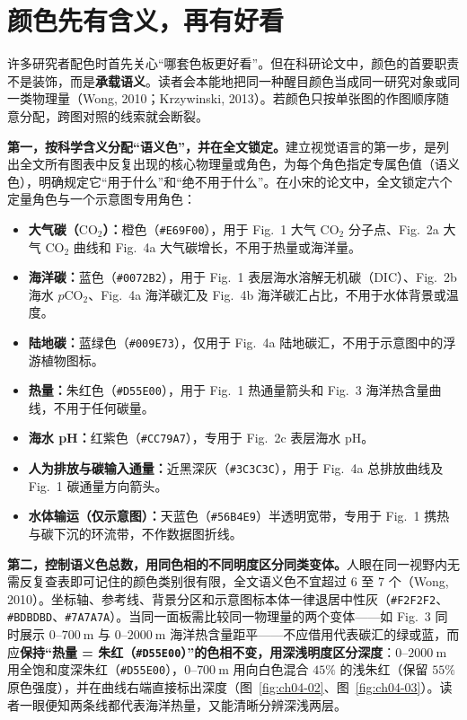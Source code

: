 \section{颜色先有含义，再有好看}

许多研究者配色时首先关心“哪套色板更好看”。但在科研论文中，颜色的首要职责不是装饰，而是\textbf{承载语义}。读者会本能地把同一种醒目颜色当成同一研究对象或同一类物理量（Wong, 2010；Krzywinski, 2013）。若颜色只按单张图的作图顺序随意分配，跨图对照的线索就会断裂。

\textbf{第一，按科学含义分配“语义色”，并在全文锁定。}建立视觉语言的第一步，是列出全文所有图表中反复出现的核心物理量或角色，为每个角色指定专属色值（语义色），明确规定它“用于什么”和“绝不用于什么”。在小宋的论文中，全文锁定六个定量角色与一个示意图专用角色：
\begin{itemize}
\item \textbf{大气碳（$\text{CO}_2$）：}橙色（\texttt{\#E69F00}），用于 Fig.\ 1 大气 $\text{CO}_2$ 分子点、Fig.\ 2a 大气 $\text{CO}_2$ 曲线和 Fig.\ 4a 大气碳增长，不用于热量或海洋量。
\item \textbf{海洋碳：}蓝色（\texttt{\#0072B2}），用于 Fig.\ 1 表层海水溶解无机碳（DIC）、Fig.\ 2b 海水 $p\text{CO}_2$、Fig.\ 4a 海洋碳汇及 Fig.\ 4b 海洋碳汇占比，不用于水体背景或温度。
\item \textbf{陆地碳：}蓝绿色（\texttt{\#009E73}），仅用于 Fig.\ 4a 陆地碳汇，不用于示意图中的浮游植物图标。
\item \textbf{热量：}朱红色（\texttt{\#D55E00}），用于 Fig.\ 1 热通量箭头和 Fig.\ 3 海洋热含量曲线，不用于任何碳量。
\item \textbf{海水 pH：}红紫色（\texttt{\#CC79A7}），专用于 Fig.\ 2c 表层海水 pH。
\item \textbf{人为排放与碳输入通量：}近黑深灰（\texttt{\#3C3C3C}），用于 Fig.\ 4a 总排放曲线及 Fig.\ 1 碳通量方向箭头。
\item \textbf{水体输运（仅示意图）：}天蓝色（\texttt{\#56B4E9}）半透明宽带，专用于 Fig.\ 1 携热与碳下沉的环流带，不作数据图折线。
\end{itemize}

\textbf{第二，控制语义色总数，用同色相的不同明度区分同类变体。}人眼在同一视野内无需反复查表即可记住的颜色类别很有限，全文语义色不宜超过 6 至 7 个（Wong, 2010）。坐标轴、参考线、背景分区和示意图标本体一律退居中性灰（\texttt{\#F2F2F2}、\texttt{\#BDBDBD}、\texttt{\#7A7A7A}）。当同一面板需比较同一物理量的两个变体——如 Fig.\ 3 同时展示 $0\text{--}700\ \text{m}$ 与 $0\text{--}2000\ \text{m}$ 海洋热含量距平——不应借用代表碳汇的绿或蓝，而应\textbf{保持“热量 = 朱红（\texttt{\#D55E00}）”的色相不变，用深浅明度区分深度}：$0\text{--}2000\ \text{m}$ 用全饱和度深朱红（\texttt{\#D55E00}），$0\text{--}700\ \text{m}$ 用向白色混合 $45\%$ 的浅朱红（保留 $55\%$ 原色强度），并在曲线右端直接标出深度（图~\ref{fig:ch04-02}、图~\ref{fig:ch04-03}）。读者一眼便知两条线都代表海洋热量，又能清晰分辨深浅两层。

